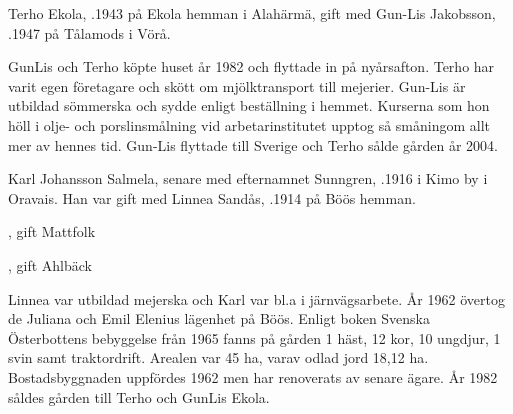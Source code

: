 %
Terho Ekola, .1943 på Ekola hemman i Alahärmä, gift med Gun-Lis Jakobsson, .1947 på Tålamods i Vörå.
\begin{jhchildren}
  \item {}
  \item {}
  \item {}
\end{jhchildren}
GunLis och Terho köpte huset år 1982 och flyttade in på nyårsafton. Terho har varit egen företagare och skött om mjölktransport till mejerier. Gun-Lis är utbildad sömmerska och sydde enligt beställning i hemmet. Kurserna som hon höll i olje- och porslinsmålning vid arbetarinstitutet upptog så småningom allt mer av hennes tid. Gun-Lis flyttade till Sverige och Terho sålde gården år 2004.


%
Karl Johansson Salmela, senare med efternamnet Sunngren, .1916 i Kimo by i Oravais. Han var gift med Linnea Sandås, .1914 på Böös hemman.
\begin{jhchildren}
  \item {}
  \item {}
  \item {}, gift Mattfolk
  \item {}, gift Ahlbäck
  \item {}
  \item {}
\end{jhchildren}
Linnea var utbildad mejerska och Karl var bl.a i järnvägsarbete. År 1962 övertog de Juliana och Emil Elenius lägenhet på Böös. Enligt boken Svenska Österbottens bebyggelse från 1965 fanns på gården 1 häst, 12 kor, 10 ungdjur, 1 svin samt traktordrift. Arealen var 45 ha, varav odlad jord 18,12 ha. Bostadsbyggnaden uppfördes 1962 men har renoverats av senare ägare. År 1982 såldes gården till Terho och GunLis Ekola.

